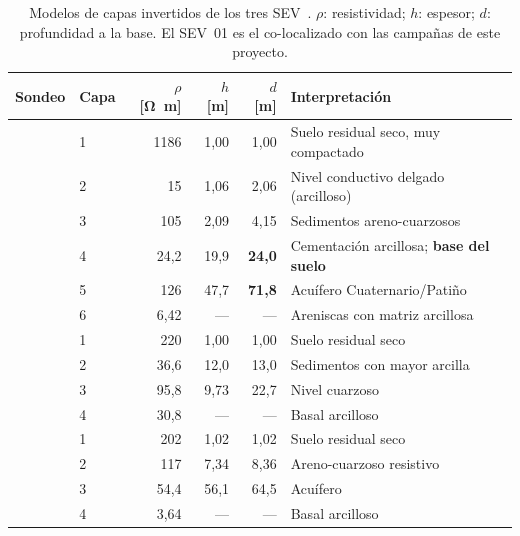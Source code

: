 \begin{table}[h]
\centering\footnotesize
\caption{Modelos de capas invertidos de los tres SEV~\cite{GonzalezHidro2023}.
$\rho$: resistividad; $h$: espesor; $d$: profundidad a la base. El SEV~01 es el
co-localizado con las campa\~nas de este proyecto.}
\label{tab:sev}
\begin{tabular}{@{}llrrrl@{}}
\toprule
Sondeo & Capa & $\rho$ [\si{\ohm\meter}] & $h$ [\si{\meter}] & $d$ [\si{\meter}] & Interpretaci\'on \\
\midrule
{}
 & 1 & 1186  & 1{,}00 & 1{,}00  & Suelo residual seco, muy compactado \\
 & 2 & 15    & 1{,}06 & 2{,}06  & Nivel conductivo delgado (arcilloso) \\
 & 3 & 105   & 2{,}09 & 4{,}15  & Sedimentos areno-cuarzosos \\
 & 4 & 24{,}2 & 19{,}9 & \textbf{24{,}0} & Cementaci\'on arcillosa; \textbf{base del suelo} \\
 & 5 & 126   & 47{,}7 & \textbf{71{,}8} & Acu\'ifero Cuaternario/Pati\~no \\
 & 6 & 6{,}42 & --- & --- & Areniscas con matriz arcillosa \\
\midrule
{}
 & 1 & 220   & 1{,}00 & 1{,}00  & Suelo residual seco \\
 & 2 & 36{,}6 & 12{,}0 & 13{,}0 & Sedimentos con mayor arcilla \\
 & 3 & 95{,}8 & 9{,}73 & 22{,}7 & Nivel cuarzoso \\
 & 4 & 30{,}8 & --- & --- & Basal arcilloso \\
\midrule
{}
 & 1 & 202   & 1{,}02 & 1{,}02 & Suelo residual seco \\
 & 2 & 117   & 7{,}34 & 8{,}36 & Areno-cuarzoso resistivo \\
 & 3 & 54{,}4 & 56{,}1 & 64{,}5 & Acu\'ifero \\
 & 4 & 3{,}64 & --- & --- & Basal arcilloso \\
\bottomrule
\end{tabular}
\end{table}

